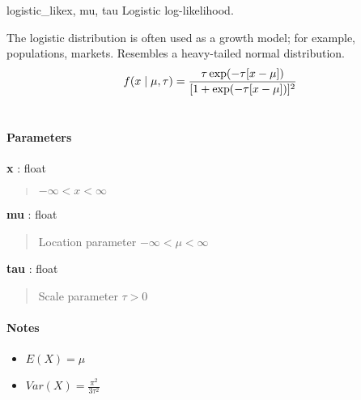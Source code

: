 \hypertarget{pymc.distributions.logistic_like}{}
\begin{funcdesc}{logistic\_like}{x, mu, tau}
Logistic log-likelihood.

The logistic distribution is often used as a growth model; for example,
populations, markets. Resembles a heavy-tailed normal distribution.
\begin{gather}
\begin{split}f(x \mid \mu, \tau) = \frac{\tau \exp(-\tau[x-\mu])}{[1 + \exp(-\tau[x-\mu])]^2}\end{split}\notag\\\begin{split}\end{split}\notag
\end{gather}\paragraph{Parameters}\begin{paramlist}

\item[] \textbf{x} : float
\begin{quote}

$-\infty < x < \infty$
\end{quote}

\item[] \textbf{mu} : float
\begin{quote}

Location parameter $-\infty < \mu < \infty$
\end{quote}

\item[] \textbf{tau} : float
\begin{quote}

Scale parameter $\tau > 0$
\end{quote}
\end{paramlist}
\paragraph{Notes}
\begin{itemize}
\item {} 
$E(X) = \mu$

\item {} 
$Var(X) = \frac{\pi^2}{3\tau^2}$

\end{itemize}
\end{funcdesc}


